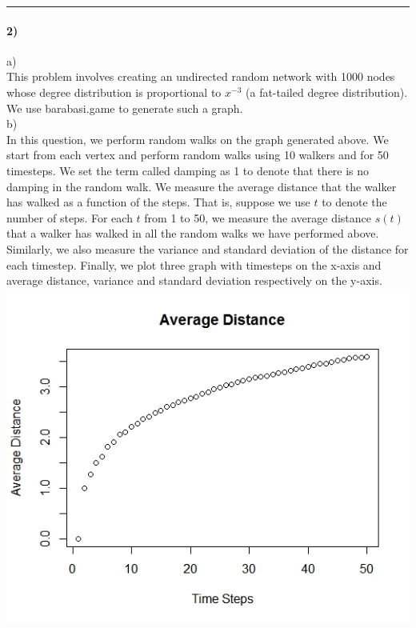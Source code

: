 \documentclass{article}
\begin{document}
\hrule

\paragraph{2)}
a)\\
This problem involves creating an undirected random network with 1000 nodes whose degree 
distribution is proportional to $x^{-3}$ (a fat-tailed degree distribution). We use barabasi.game to generate 
such a graph.\\

b)\\
In this question, we perform random walks on the graph generated above. We start from each vertex and 
perform random walks using 10 walkers and for 50 timesteps.  We set the term called damping as 1 to denote that
there is no damping in the random walk. We measure the average distance that the 
walker has walked as a function of the steps. That is, suppose we use $t$ to denote the number of steps.
For each $t$ from 1 to 50, we measure the average distance $s(t)$ that a walker has walked in all the random
walks we have performed above. Similarly, we also measure the variance and standard deviation of the 
distance for each timestep. Finally, we plot three graph with timesteps on the x-axis and average distance, variance
and standard deviation respectively on the y-axis.\\
\includegraphics[scale=0.4]{p2a} \\
\end{document}
